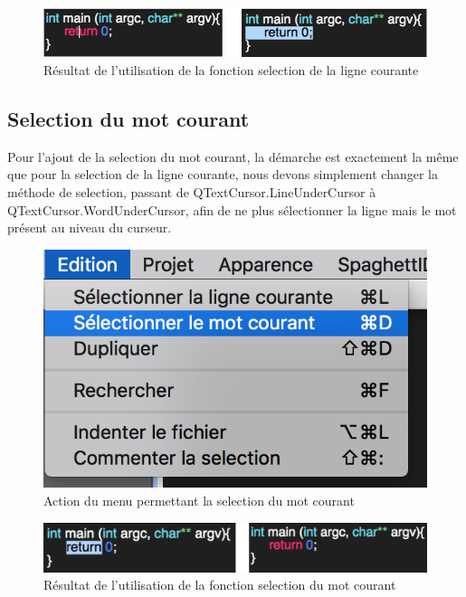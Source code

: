 \documentclass[a4paper,12pt]{article}
\begin{document}
	\begin{figure}[h!]
		\begin{center}
			\includegraphics[scale=0.8]{images/imgs_edit/resultat_selection_ligne}
			\caption{Résultat de l'utilisation de la fonction selection de la ligne courante}
		\end{center}
	\end{figure}

\subsection{Selection du mot courant}

	Pour l'ajout de la selection du mot courant, la démarche est exactement la même que pour la selection de la ligne courante, nous devons simplement changer la méthode de selection, passant de QTextCursor.LineUnderCursor à QTextCursor.WordUnderCursor, afin de ne plus sélectionner la ligne mais le mot présent au niveau du curseur. 

	\begin{figure}[h!]
		\begin{center}
			\includegraphics[scale=0.4]{images/imgs_edit/utilisation_selection_mot}
			\caption{Action du menu permettant la selection du mot courant}
		\end{center}
	\end{figure}

	\begin{figure}[h!]
		\begin{center}
			\includegraphics[scale=0.8]{images/imgs_edit/resultat_selection_mot}
			\caption{Résultat de l'utilisation de la fonction selection du mot courant}
		\end{center}
	\end{figure}
	
\end{document}
